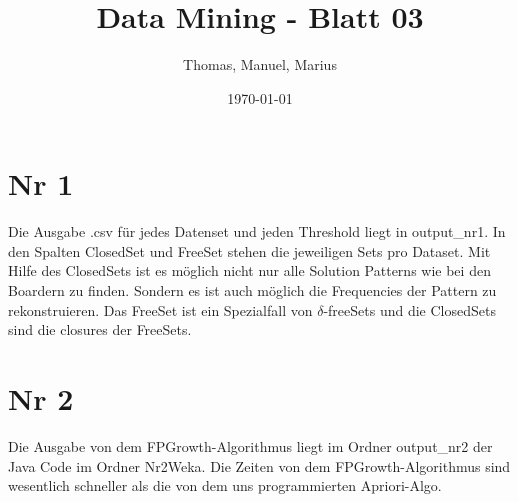 \documentclass{article}
\title{Data Mining - Blatt 03}
\author{Thomas, Manuel, Marius}
\date{\today}
\begin{document}
\maketitle

\section{Nr 1}
Die Ausgabe .csv für jedes Datenset und jeden Threshold liegt in output\_nr1. In den Spalten ClosedSet und FreeSet
stehen die jeweiligen Sets pro Dataset. Mit Hilfe des ClosedSets ist es möglich nicht nur alle Solution Patterns wie
bei den Boardern zu finden. Sondern es ist auch möglich die Frequencies der Pattern zu rekonstruieren. Das FreeSet ist
ein Spezialfall von $\delta$-freeSets und die ClosedSets sind die closures der FreeSets.

\section{Nr 2}
Die Ausgabe von dem FPGrowth-Algorithmus liegt im Ordner output\_nr2 der Java Code im Ordner Nr2Weka. Die Zeiten von dem
FPGrowth-Algorithmus sind wesentlich schneller als die von dem uns programmierten Apriori-Algo.
\end{document}
